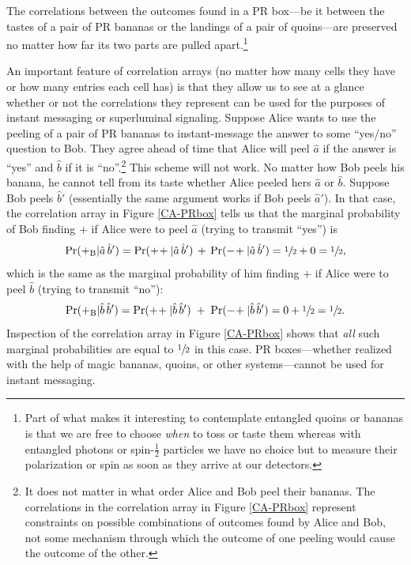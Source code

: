 The correlations between the outcomes found in a PR box---be it between the tastes of a pair of PR bananas or the landings of a pair of quoins---are preserved no matter how far its two parts are pulled apart.\footnote{Part of what makes it interesting to contemplate entangled quoins or bananas is that we are free to choose \emph{when} to toss or taste them whereas with entangled photons or spin-$\frac12$ particles we have no choice but to measure their polarization or spin as soon as they arrive at our detectors.} 

An important feature of correlation arrays (no matter how many cells they have or how many entries each cell has) is that they allow us to see at a glance whether or not the correlations they represent can be used for the purposes of instant messaging or superluminal signaling. Suppose Alice wants to use the peeling of a pair of PR bananas to instant-message the answer to some ``yes/no'' question to Bob. They agree ahead of time that Alice will peel $\hat{a}$ if the answer is ``yes'' and $\hat{b}$ if it is ``no''.\footnote{It does not matter in what order Alice and Bob peel their bananas. The correlations in the correlation array in Figure \ref{CA-PRbox} represent constraints on possible combinations of outcomes found by Alice and Bob, not some mechanism through which the outcome of one peeling would cause the outcome of the other.\label{peeling order irrelevant}}  This scheme will not work. No matter how Bob peels his banana, he cannot tell from its taste whether Alice peeled hers $\hat{a}$ or $\hat{b}$. Suppose Bob peels $\hat{b}'$ (essentially the same argument works if Bob peels $\hat{a}'$). In that case, the correlation array in Figure \ref{CA-PRbox} tells us that the marginal probability of Bob finding $+$  if Alice were to peel $\hat{a}$ (trying to transmit ``yes'') is
\begin{equation}
\mathrm{Pr}(+_{\mathrm B}| \hat{a} \,\hat{b}') = \mathrm{Pr}(+\!+| \hat{a} \,\hat{b}') \, + \, \mathrm{Pr}(-\!+| \hat{a} \,\hat{b}') =  \sfrac12 + 0 = \sfrac12,
\label{non-signaling property 1}
\end{equation}
which is the same as the marginal probability of him finding $+$  if Alice were to peel $\hat{b}$ (trying to transmit ``no''):
\begin{equation}
\mathrm{Pr}(+_{\mathrm B}| \hat{b} \,\hat{b}') = \mathrm{Pr}(+\!+| \hat{b} \,\hat{b}') \; + \; \mathrm{Pr}(-\!+| \hat{b} \,\hat{b}') =  0 + \sfrac12 = \sfrac12.
\label{non-signaling property 2}
\end{equation}
Inspection of the correlation array in Figure \ref{CA-PRbox} shows that \emph{all} such marginal probabilities are equal to $\sfrac12$ in this case. PR boxes---whether realized with the help of magic bananas, quoins, or other systems---cannot be used for instant messaging. 

